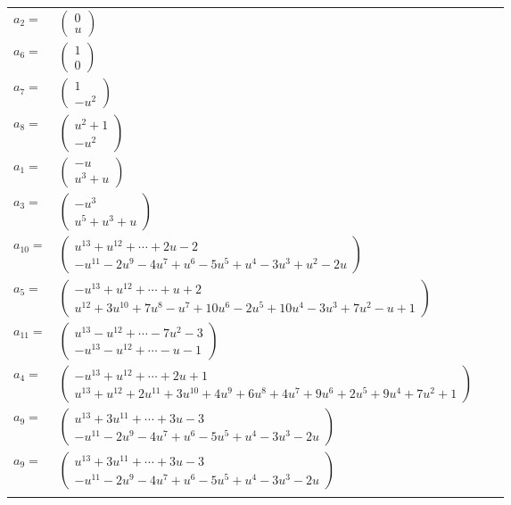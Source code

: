 \documentclass[1p]{elsarticle_modified}
\theoremstyle{definition}
\begin{document}
\begin{tabular}{m{7pt} m{180pt} m{7pt} m{180pt} }
\flushright $a_{2}=$&$\begin{pmatrix}0\\u\end{pmatrix}$ \\
\flushright $a_{6}=$&$\begin{pmatrix}1\\0\end{pmatrix}$ \\
\flushright $a_{7}=$&$\begin{pmatrix}1\\- u^2\end{pmatrix}$ \\
\flushright $a_{8}=$&$\begin{pmatrix}u^2+1\\- u^2\end{pmatrix}$ \\
\flushright $a_{1}=$&$\begin{pmatrix}- u\\u^3+u\end{pmatrix}$ \\
\flushright $a_{3}=$&$\begin{pmatrix}- u^3\\u^5+u^3+u\end{pmatrix}$ \\
\flushright $a_{10}=$&$\begin{pmatrix}u^{13}+u^{12}+\cdots+2 u-2\\- u^{11}-2 u^9-4 u^7+u^6-5 u^5+u^4-3 u^3+u^2-2 u\end{pmatrix}$ \\
\flushright $a_{5}=$&$\begin{pmatrix}- u^{13}+u^{12}+\cdots+u+2\\u^{12}+3 u^{10}+7 u^8- u^7+10 u^6-2 u^5+10 u^4-3 u^3+7 u^2- u+1\end{pmatrix}$ \\
\flushright $a_{11}=$&$\begin{pmatrix}u^{13}- u^{12}+\cdots-7 u^2-3\\- u^{13}- u^{12}+\cdots- u-1\end{pmatrix}$ \\
\flushright $a_{4}=$&$\begin{pmatrix}- u^{13}+u^{12}+\cdots+2 u+1\\u^{13}+u^{12}+2 u^{11}+3 u^{10}+4 u^9+6 u^8+4 u^7+9 u^6+2 u^5+9 u^4+7 u^2+1\end{pmatrix}$ \\
\flushright $a_{9}=$&$\begin{pmatrix}u^{13}+3 u^{11}+\cdots+3 u-3\\- u^{11}-2 u^9-4 u^7+u^6-5 u^5+u^4-3 u^3-2 u\end{pmatrix}$\\ \flushright $a_{9}=$&$\begin{pmatrix}u^{13}+3 u^{11}+\cdots+3 u-3\\- u^{11}-2 u^9-4 u^7+u^6-5 u^5+u^4-3 u^3-2 u\end{pmatrix}$\\&\end{tabular}
\end{document}
